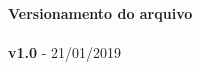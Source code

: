 \thispagestyle{empty} %
\vspace*{\fill}
\noindent
\sffamily
\small
\textbf{Versionamento do arquivo}\\
\\
\textbf{v1.0} - 21/01/2019\\
\normalsize
\normalfont
\vspace*{2.5cm}
